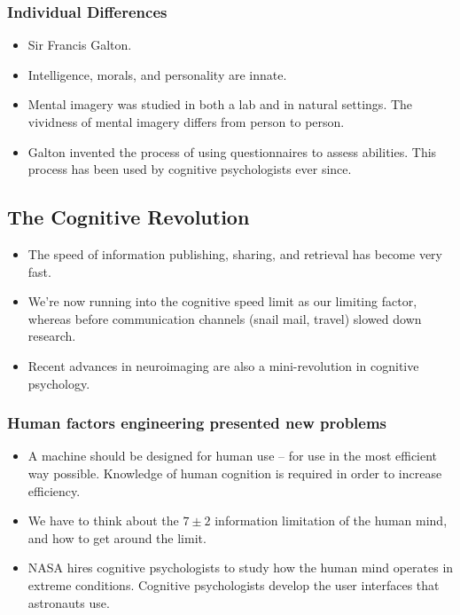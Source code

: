 \documentclass[]{article}
\begin{document}
			\subsubsection{Individual Differences}
				\begin{itemize}
					\item Sir Francis Galton.
					\item Intelligence, morals, and personality are innate.
					\item Mental imagery was studied in both a lab and in natural settings. The vividness of mental imagery differs from person to person.
					\item Galton invented the process of using questionnaires to assess abilities. This process has been used by cognitive psychologists ever since.
				\end{itemize}
			
		\subsection{The Cognitive Revolution}
			\begin{itemize}
				\item The speed of information publishing, sharing, and retrieval has become very fast.
				\item We're now running into the cognitive speed limit as our limiting factor, whereas before communication channels (snail mail, travel) slowed down research.
				\item Recent advances in neuroimaging are also a mini-revolution in cognitive psychology.
			\end{itemize}
			
			\subsubsection{Human factors engineering presented new problems}
				\begin{itemize}
					\item A machine should be designed for human use -- for use in the most efficient way possible. Knowledge of human cognition is required in order to increase efficiency.
					\item We have to think about the $7 \pm 2$ information limitation of the human mind, and how to get around the limit.
					\item NASA hires cognitive psychologists to study how the human mind operates in extreme conditions. Cognitive psychologists develop the user interfaces that astronauts use.
				\end{itemize}
			
\end{document}
